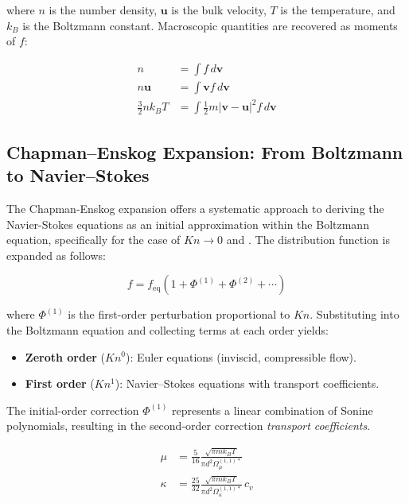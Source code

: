 \noindent where $n$ is the number density, $\mathbf{u}$ is the bulk velocity, $T$ is the temperature, and $k_B$ is the Boltzmann constant. Macroscopic quantities are recovered as moments of $f$:

\begin{align}
    n &= \int f \, d\mathbf{v} \label{eq:moment_density} \\
    n\mathbf{u} &= \int \mathbf{v} f \, d\mathbf{v} \label{eq:moment_momentum} \\
    \frac{3}{2} n k_B T &= \int \frac{1}{2} m |\mathbf{v} - \mathbf{u}|^2 f \, d\mathbf{v} \label{eq:moment_energy}
\end{align}

\subsection{Chapman--Enskog Expansion: From Boltzmann to Navier--Stokes}

The Chapman-Enskog expansion offers a systematic approach to deriving the Navier-Stokes equations as an initial approximation within the Boltzmann equation, specifically for the case of $Kn \to 0$ and \cite{bird1994molecular}. The distribution function is expanded as follows:

\begin{equation}
    f = f_{\text{eq}} \left( 1 + \Phi^{(1)} + \Phi^{(2)} + \cdots \right)
    \label{eq:chapman_enskog}
\end{equation}

\noindent where $\Phi^{(1)}$ is the first-order perturbation proportional to $Kn$. Substituting into the Boltzmann equation and collecting terms at each order yields:

\begin{itemize}
    \item \textbf{Zeroth order} ($Kn^0$): Euler equations (inviscid, compressible flow).

    \item \textbf{First order} ($Kn^1$): Navier--Stokes equations with transport coefficients.
\end{itemize}

The initial-order correction $\Phi^{(1)}$ represents a linear combination of Sonine polynomials, resulting in the second-order correction \textit{transport coefficients}.

\begin{align}
    \mu &= \frac{5}{16} \frac{\sqrt{\pi m k_B T}}{\pi d^2 \Omega_\mu^{(1,1)*}} \label{eq:chapman_viscosity} \\
    \kappa &= \frac{25}{32} \frac{\sqrt{\pi m k_B T}}{\pi d^2 \Omega_\kappa^{(1,1)*}} \, c_v \label{eq:chapman_conductivity}
\end{align}

